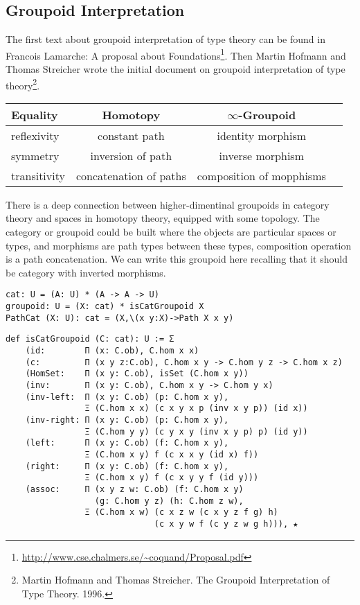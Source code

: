 \documentclass{article}
\begin{document}
\newpage
\subsection{Groupoid Interpretation}
The first text about groupoid interpretation of type theory can be found in Francois Lamarche:
A proposal about Foundations\footnote{\url{http://www.cse.chalmers.se/~coquand/Proposal.pdf}}.
Then Martin Hofmann and Thomas Streicher wrote the initial
document on groupoid interpretation of type
theory\footnote{Martin Hofmann and Thomas Streicher. The Groupoid Interpretation of Type Theory. 1996.}.

\begin{table}[H]
\begin{center}
\begin{tabular}{lccc}
\hline
{\bf Equality} & {\bf Homotopy} & {\bf $\infty$-Groupoid} \\
\hline
reflexivity  & constant path & identity morphism \\
symmetry     & inversion of path & inverse morphism \\
transitivity & concatenation of paths & composition of mopphisms \\
\hline
\end{tabular}
\end{center}
\end{table}

There is a deep connection between higher-dimentinal groupoids in category theory and
spaces in homotopy theory, equipped with some topology. The category or groupoid could
be built where the objects are particular spaces or types, and morphisms are path types
between these types, composition operation is a path concatenation. We can write this
groupoid here recalling that it should be category with inverted morphisms.

\begin{lstlisting}
cat: U = (A: U) * (A -> A -> U)
groupoid: U = (X: cat) * isCatGroupoid X
PathCat (X: U): cat = (X,\(x y:X)->Path X x y)
\end{lstlisting}

\begin{lstlisting}
def isCatGroupoid (C: cat): U := Σ
    (id:        Π (x: C.ob), C.hom x x)
    (c:         Π (x y z:C.ob), C.hom x y -> C.hom y z -> C.hom x z)
    (HomSet:    Π (x y: C.ob), isSet (C.hom x y))
    (inv:       Π (x y: C.ob), C.hom x y -> C.hom y x)
    (inv-left:  Π (x y: C.ob) (p: C.hom x y),
                Ξ (C.hom x x) (c x y x p (inv x y p)) (id x))
    (inv-right: Π (x y: C.ob) (p: C.hom x y),
                Ξ (C.hom y y) (c y x y (inv x y p) p) (id y))
    (left:      Π (x y: C.ob) (f: C.hom x y),
                Ξ (C.hom x y) f (c x x y (id x) f))
    (right:     Π (x y: C.ob) (f: C.hom x y),
                Ξ (C.hom x y) f (c x y y f (id y)))
    (assoc:     Π (x y z w: C.ob) (f: C.hom x y)
                  (g: C.hom y z) (h: C.hom z w),
                Ξ (C.hom x w) (c x z w (c x y z f g) h)
                              (c x y w f (c y z w g h))), ★
\end{lstlisting}
\end{document}
